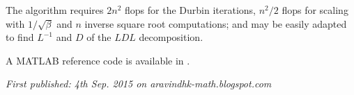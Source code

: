 The algorithm requires $2n^2$ flops \cite[Algorithm 4.7.1]{Golub2012} for the Durbin iterations, $n^2/2$ flops for scaling with $1/\sqrt\beta$ and $n$ inverse square root computations; and may be easily adapted to find $L^{-1}$ and $D$ of the $LDL$ decomposition.

A MATLAB reference code is available in \cite{KrishnamoorthyMathWorks2015}.

\emph{First published: 4th Sep. 2015 on aravindhk-math.blogspot.com}
